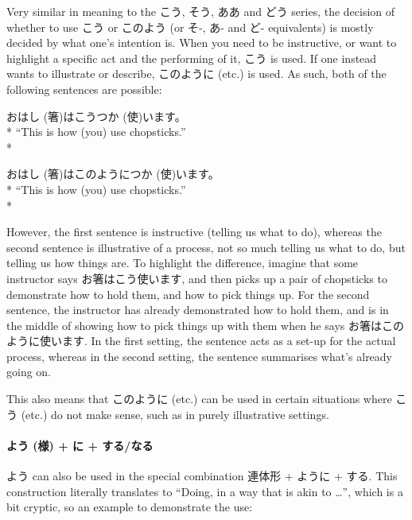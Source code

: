 \documentclass[11pt, b5paper, twoside, openright, onecolumn]{book}
\makeatletter
\newcommand*{\rubystack}[2]{{\relscale{0.5}%
  \begin{tabular}[b]{@{}c@{}}%
    {#1}\\%
   {\textscale{2}{#2}}%
  \end{tabular}}%
}
\DeclareRobustCommand*{\ruby}[2]{%
  \mbox{%
    \setlength{\parskip}{0ex}%
    \BeginAccSupp{method=pdfstringdef,ActualText={#1}}%
      \rubystack{\phantom{#2}}{#1}%
      \llap{%
        \rubystack{#2}{\phantom{#1}}%
      }%
    \EndAccSupp{}%
  }%
}
\renewcommand*{\ruby}[2]{#2 (#1)}%
\newenvironment{exampleblock}{
\setlength{\parindent}{0.6in}
\begin{minipage}[t]{\dimexpr\textwidth-\parindent}}
{\end{minipage}}
\makeatother
\begin{document}
Very similar in meaning to the こう‚ そう‚ ああ and どう series‚ the decision of whether to use こう or このよう (or そ-‚ あ- and ど- equivalents) is mostly decided by what one’s intention is. When you need to be instructive‚ or want to highlight a specific act and the performing of it‚ こう is used. If one instead wants to illustrate or describe‚ このように (etc.) is used. As such‚ both of the following sentences are possible:

\vspace{0.4cm}
\begin{exampleblock}
お\ruby{箸}{はし}はこう\ruby{使}{つか}います。 \\* 
“This is how (you) use chopsticks.” \\* 
\end{exampleblock}
\vspace{0.2cm}

\begin{exampleblock}
お\ruby{箸}{はし}はこのように\ruby{使}{つか}います。 \\* 
“This is how (you) use chopsticks.” \\* 
\end{exampleblock}
\vspace{0.2cm}

However‚ the first sentence is instructive (telling us what to do)‚ whereas the second sentence is illustrative of a process‚ not so much telling us what to do‚ but telling us how things are. To highlight the difference‚ imagine that some instructor says お箸はこう使います‚ and then picks up a pair of chopsticks to demonstrate how to hold them‚ and how to pick things up. For the second sentence‚ the instructor has already demonstrated how to hold them‚ and is in the middle of showing how to pick things up with them when he says お箸はこのように使います. In the first setting‚ the sentence acts as a set-up for the actual process‚ whereas in the second setting‚ the sentence summarises what’s already going on.

This also means that このように (etc.) can be used in certain situations where こう (etc.) do not make sense‚ such as in purely illustrative settings.

\paragraph{\ruby{様}{よう} + に + する/なる}

よう can also be used in the special combination 連体形 + ように + する. This construction literally translates to “Doing‚ in a way that is akin to …”‚ which is a bit cryptic‚ so an example to demonstrate the use:
\end{document}
